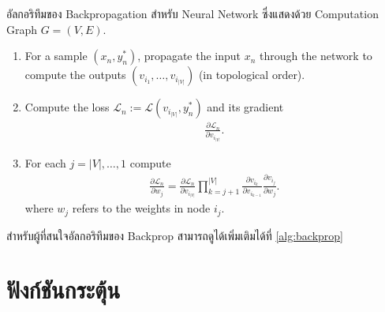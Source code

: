 \begin{algorithm}[ht]
    \caption{อัลกอริทึมของ Backpropagation สำหรับ Neural Network ซึ่งแสดงด้วย Computation Graph $G = (V,E)$.}
    \label{alg:backprop}
    \begin{enumerate}
        \item For a sample $(x_n ,y^*_n)$, propagate the input $x_n$ through the
        network to compute the outputs $(v_{i_1}, \ldots, v_{i_{|V|}})$ (in topological order).

        \item Compute the loss $\mathcal{L}_n := \mathcal{L}(v_{i_{|V|}}, y_n^*)$
        and its gradient
        \begin{align}
        \frac{\partial \mathcal{L}_n}{\partial v_{i_{|V|}}}.
        \end{align}

        \item For each $j = |V|,\ldots,1$ compute
        \begin{align}
        \frac{\partial \mathcal{L}_n}{\partial w_j} =
        \frac{\partial \mathcal{L}_n}{\partial v_{i_{|V|}}} \prod_{k = j + 1}^{|V|} 
        \frac{\partial v_{i_k}}{\partial v_{i_{k - 1}}}
        \frac{\partial v_{i_j}}{\partial w_j}.
        \end{align}
        where $w_j$ refers to the weights in node $i_j$.
    \end{enumerate}
\end{algorithm}

สำหรับผู้ที่สนใจอัลกอริทึมของ Backprop สามารถดูได้เพิ่มเติมได้ที่ \ref{alg:backprop}

\section{ฟังก์ชันกระตุ้น}
\label{sec:act_func}

